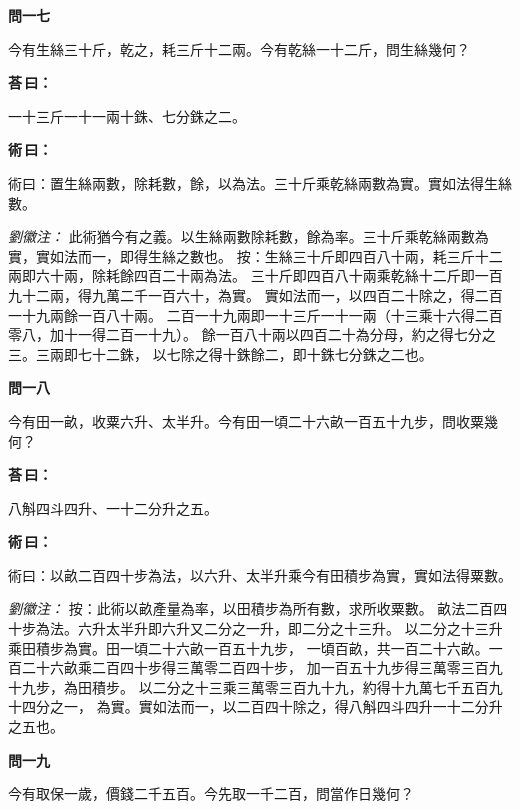 \documentclass[11pt,a4paper]{article}
\newenvironment{problem}[1][]{%
  \par\vspace{0.6em}\noindent\textcolor{problemcolor}{\textbf{問\ignorespaces#1\unskip}\hspace{0.5em}}%
  \ignorespaces
}{\par\vspace{0.4em}}
\newenvironment{answer}{%
  \par\noindent\textcolor{answercolor}{\textbf{荅\,曰：}}%
  \ignorespaces
}{\par\vspace{0.3em}}
\newenvironment{method}{%
  \par\noindent\textcolor{methodcolor}{\textbf{術\,曰：}}%
  \ignorespaces
}{\par\vspace{0.4em}}
\newenvironment{liuhuicomm}{%
  \par\vspace{0.3em}\noindent\textcolor{commentarycolor}{\small\textit{劉徽注：}}}%
  {\par\vspace{0.5em}}
\begin{document}
\begin{problem}[一七]
今有生絲三十斤，乾之，耗三斤十二兩。今有乾絲一十二斤，問生絲幾何？
\end{problem}

\begin{answer}
一十三斤一十一兩十銖、七分銖之二。
\end{answer}

\begin{method}
術曰：置生絲兩數，除耗數，餘，以為法。三十斤乘乾絲兩數為實。實如法得生絲數。
\end{method}

\begin{liuhuicomm}
此術猶今有之義。以生絲兩數除耗數，餘為率。三十斤乘乾絲兩數為實，實如法而一，即得生絲之數也。
按：生絲三十斤即四百八十兩，耗三斤十二兩即六十兩，除耗餘四百二十兩為法。
三十斤即四百八十兩乘乾絲十二斤即一百九十二兩，得九萬二千一百六十，為實。
實如法而一，以四百二十除之，得二百一十九兩餘一百八十兩。
二百一十九兩即一十三斤一十一兩（十三乘十六得二百零八，加十一得二百一十九）。
餘一百八十兩以四百二十為分母，約之得七分之三。三兩即七十二銖，
以七除之得十銖餘二，即十銖七分銖之二也。
\end{liuhuicomm}

\begin{problem}[一八]
今有田一畝，收粟六升、太半升。今有田一頃二十六畝一百五十九步，問收粟幾何？
\end{problem}

\begin{answer}
八斛四斗四升、一十二分升之五。
\end{answer}

\begin{method}
術曰：以畝二百四十步為法，以六升、太半升乘今有田積步為實，實如法得粟數。
\end{method}

\begin{liuhuicomm}
按：此術以畝產量為率，以田積步為所有數，求所收粟數。
畝法二百四十步為法。六升太半升即六升又二分之一升，即二分之十三升。
以二分之十三升乘田積步為實。田一頃二十六畝一百五十九步，
一頃百畝，共一百二十六畝。一百二十六畝乘二百四十步得三萬零二百四十步，
加一百五十九步得三萬零三百九十九步，為田積步。
以二分之十三乘三萬零三百九十九，約得十九萬七千五百九十四分之一，
為實。實如法而一，以二百四十除之，得八斛四斗四升一十二分升之五也。
\end{liuhuicomm}

\begin{problem}[一九]
今有取保一歲，價錢二千五百。今先取一千二百，問當作日幾何？
\end{problem}
\end{document}
